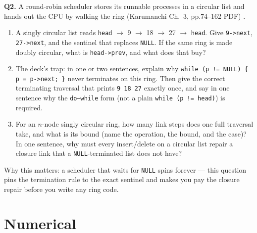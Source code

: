 \documentclass[11pt]{article}
\begin{document}
\textbf{Q2.} A round-robin scheduler stores its runnable processes in a circular list and hands out the CPU by walking the ring (Karumanchi Ch.~3, pp.74--162 PDF) \cite{Karumanchi2017_data_structures_algorithms_made_easy}.
\begin{enumerate}
  \item[(a)] A singly circular list reads \texttt{head} $\to$ 9 $\to$ 18 $\to$ 27 $\to$ \texttt{head}. Give \texttt{9->next}, \texttt{27->next}, and the sentinel that replaces \texttt{NULL}. If the same ring is made doubly circular, what is \texttt{head->prev}, and what does that buy?
  \item[(b)] The deck's trap: in one or two sentences, explain why \texttt{while (p != NULL) \{ p = p->next; \}} never terminates on this ring. Then give the correct terminating traversal that prints \texttt{9 18 27} exactly once, and say in one sentence why the \texttt{do--while} form (not a plain \texttt{while (p != head)}) is required.
  \item[(c)] For an $n$-node singly circular ring, how many link steps does one full traversal take, and what is its bound (name the operation, the bound, and the case)? In one sentence, why must every insert/delete on a circular list repair a closure link that a \texttt{NULL}-terminated list does not have?
\end{enumerate}
Why this matters: a scheduler that waits for \texttt{NULL} spins forever --- this question pins the termination rule to the exact sentinel and makes you pay the closure repair before you write any ring code.

\section{Numerical}
\end{document}
